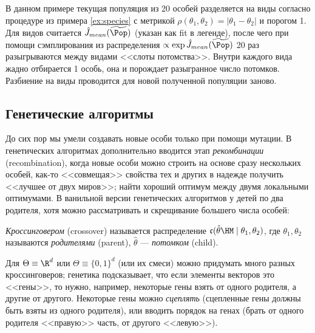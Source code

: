\begin{example}
В данном примере текущая популяция из 20 особей разделяется на виды согласно процедуре из примера \ref{ex:species} с метрикой $\rho(\theta_1, \theta_2) = |\theta_1 - \theta_2|$ и порогом 1. Для видов считается $\hat{J}_{\mathop{mean}}(\widetilde{\Pop})$ (указан как fit в легенде), после чего при помощи сэмплирования из распределения $\propto \exp \hat{J}_{\mathop{mean}}(\widetilde{\Pop})$ 20 раз разыгрываются между видами <<слоты потомства>>. Внутри каждого вида жадно отбирается 1 особь, она и порождает разыгранное число потомков. Разбиение на виды проводится для новой полученной популяции заново.
\begin{center}
\end{center}
\end{example}

\subsection{Генетические алгоритмы}

До сих пор мы умели создавать новые особи только при помощи мутации. В генетических алгоритмах дополнительно вводится этап \emph{рекомбинации} (recombination), когда новые особи можно строить на основе сразу нескольких особей, как-то <<совмещая>> свойства тех и других в надежде получить <<лучшее от двух миров>>; найти хороший оптимум между двумя локальными оптимумами. В ванильной версии генетических алгоритмов у детей по два родителя, хотя можно рассматривать и скрещивание большего числа особей:

\newcommand{\cross}{\mathfrak{c}}
\begin{definition}
\emph{Кроссинговером} (crossover) называется распределение $\cross(\hat{\theta} \HM\mid \theta_1, \theta_2)$, где $\theta_1, \theta_2$ называются \emph{родителями} (parent), $\hat{\theta}$ --- \emph{потомком} (child).
\end{definition}

\begin{example}
Для $\Theta \equiv \R^d$ или $\Theta \equiv \{0, 1\}^d$ (или их смеси) можно придумать много разных кроссинговеров; генетика подсказывает, что если элементы векторов это <<гены>>, то нужно, например, некоторые гены взять от одного родителя, а другие от другого. Некоторые гены можно \emph{сцеплять} (сцепленные гены должны быть взяты из одного родителя), или вводить порядок на генах (брать от одного родителя <<правую>> часть, от другого <<левую>>).
\end{example}

